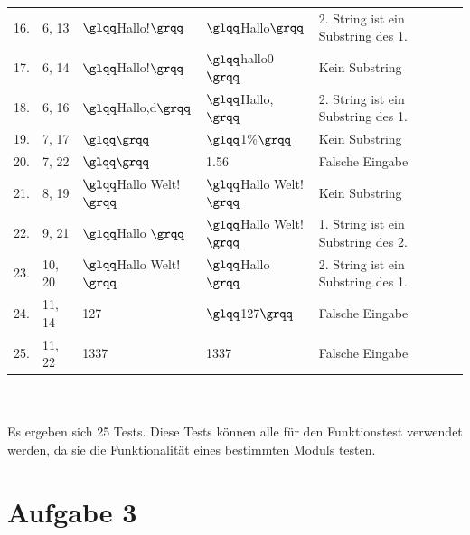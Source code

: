 \documentclass[a4paper]{report}
\begin{document}
\begin{tabular}{l|l|ll|l}
16.			& 6, 13				& $\glqq$Hallo!$\grqq$		& $\glqq$Hallo$\grqq$		& 2. String ist ein Substring des 1.\\
17.			& 6, 14				& $\glqq$Hallo!$\grqq$		& $\glqq$hallo0$\grqq$		& Kein Substring\\
18.			& 6, 16				& $\glqq$Hallo,d$\grqq$		& $\glqq$Hallo,$\grqq$		& 2. String ist ein Substring des 1.\\
19.			& 7, 17				& $\glqq \grqq$				& $\glqq$1\%$\grqq$			& Kein Substring\\
20.			& 7, 22				& $\glqq \grqq$				& 1.56						& Falsche Eingabe\\
21.			& 8, 19				& $\glqq$Hallo Welt!$\grqq$& $\glqq$Hallo Welt!$\grqq$& Kein Substring\\
22.			& 9, 21				& $\glqq$Hallo $\grqq$		& $\glqq$Hallo Welt!$\grqq$& 1. String ist ein Substring des 2.\\
23.			& 10, 20			& $\glqq$Hallo Welt!$\grqq$& $\glqq$Hallo $\grqq$		& 2. String ist ein Substring des 1.\\
24.			& 11, 14			& 127						& $\glqq$127$\grqq$			& Falsche Eingabe\\
25.			& 11, 22			& 1337						& 1337						& Falsche Eingabe\\
\end{tabular} \\ \\
Es ergeben sich 25 Tests. Diese Tests können alle für den Funktionstest verwendet werden, da sie die Funktionalität eines bestimmten Moduls testen. \\

\newpage
\section*{Aufgabe 3}
\end{document}
